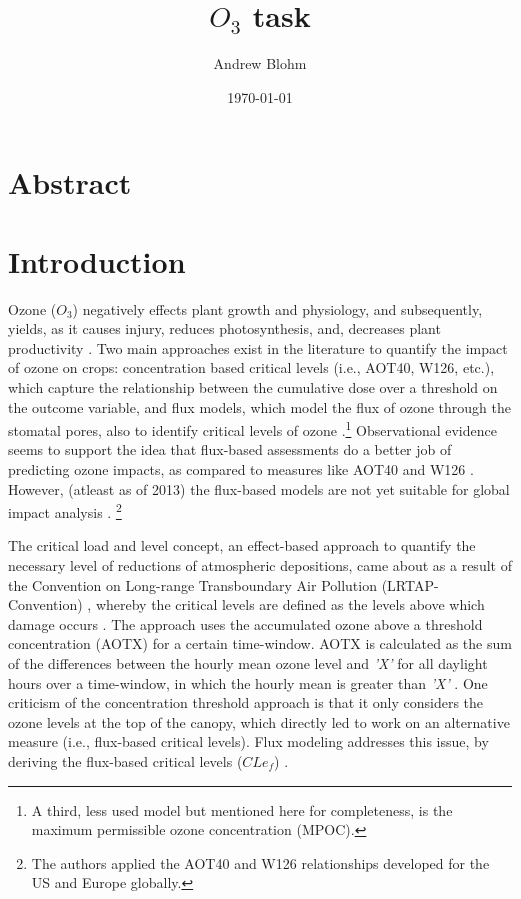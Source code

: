 \documentclass[10pt]{amsart}
\title{$O_{3}$ task}
\author{Andrew Blohm}
\date{\today}
\begin{document}
\maketitle

\section{Abstract}

\section{Introduction}
Ozone ($O_{3}$) negatively effects plant growth and physiology, and subsequently, yields, as it causes injury, reduces photosynthesis, and, decreases plant productivity \parencite{mishra:2013aa}. 
Two main approaches exist in the literature to quantify the impact of ozone on crops: concentration based critical levels (i.e., AOT40, W126, etc.), which capture the relationship between the cumulative dose over a threshold on the outcome variable, and flux models, which model the flux of ozone through the stomatal pores, also to identify critical levels of ozone \parencite{mills:2007aa}.\footnote{A third, less used model but mentioned here for completeness, is the maximum permissible ozone concentration (MPOC)\parencite{mills:2007aa}.}
Observational evidence seems to support the idea that flux-based assessments do a better job of predicting ozone impacts, as compared to measures like AOT40 and W126 \parencite{avnery:2013ab}.
However, (atleast as of 2013) the flux-based models are not yet suitable for global impact analysis \parencite{avnery:2013ab}. \footnote{The authors applied the AOT40 and W126 relationships developed for the US and Europe globally.} 

The critical load and level concept, an effect-based approach to quantify the necessary level of reductions of atmospheric depositions, came about as a result of the Convention on Long-range Transboundary Air Pollution (LRTAP-Convention) \parencite{clrtap:2015aa}, whereby the critical levels are defined as the levels above which damage occurs \parencite{clrtap:2015aa}. 
The approach uses the accumulated ozone above a threshold concentration (AOTX) for a certain time-window. 
AOTX is calculated as the sum of the differences between the hourly mean ozone level and \textit{'X'} for all daylight hours over a time-window, in which the hourly mean is greater than \textit{'X'} \parencite{mills:2007aa}.
One criticism of the concentration threshold approach is that it only considers the ozone levels at the top of the canopy, which directly led to work on an alternative measure (i.e., flux-based critical levels).
Flux modeling addresses this issue, by deriving the flux-based critical levels ($CLe_{f}$) \parencite{mills:2007aa}.
\end{document}
